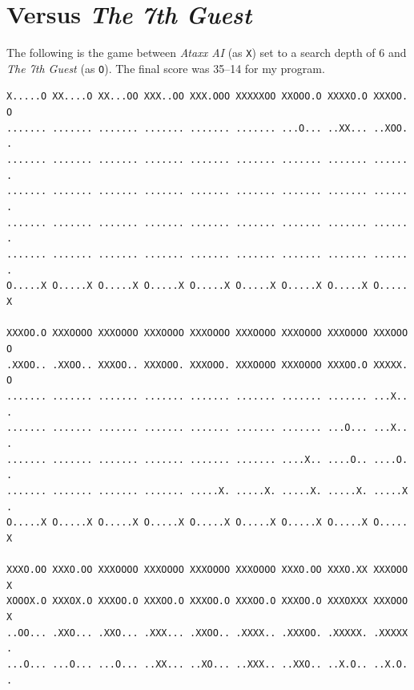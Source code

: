 \documentclass[12pt]{article}
\newcommand{\X}{\texttt{X}}
\renewcommand{\O}{\texttt{O}}
\begin{document}
\pagebreak
\appendix\section{Versus \textsl{The 7th Guest}}
The following is the game between \textsl{Ataxx AI} (as \X) set to a search depth of 6 and \textsl{The 7th Guest} (as \O).  The final score was 35--14 for my program.
\begin{center}\texttt{X.....O~XX....O~XX...OO~XXX..OO~XXX.OOO~XXXXXOO~XXOOO.O~XXXXO.O~XXXOO.O~\\
.......~.......~.......~.......~.......~.......~...O...~..XX...~..XOO..~\\
.......~.......~.......~.......~.......~.......~.......~.......~.......~\\
.......~.......~.......~.......~.......~.......~.......~.......~.......~\\
.......~.......~.......~.......~.......~.......~.......~.......~.......~\\
.......~.......~.......~.......~.......~.......~.......~.......~.......~\\
O.....X~O.....X~O.....X~O.....X~O.....X~O.....X~O.....X~O.....X~O.....X~\\
~\\
XXXOO.O~XXXOOOO~XXXOOOO~XXXOOOO~XXXOOOO~XXXOOOO~XXXOOOO~XXXOOOO~XXXOOOO~\\
.XXOO..~.XXOO..~XXXOO..~XXXOOO.~XXXOOO.~XXXOOOO~XXXOOOO~XXXOO.O~XXXXX.O~\\
.......~.......~.......~.......~.......~.......~.......~.......~...X...~\\
.......~.......~.......~.......~.......~.......~.......~...O...~...X...~\\
.......~.......~.......~.......~.......~.......~....X..~....O..~....O..~\\
.......~.......~.......~.......~.....X.~.....X.~.....X.~.....X.~.....X.~\\
O.....X~O.....X~O.....X~O.....X~O.....X~O.....X~O.....X~O.....X~O.....X~\\
~\\
XXXO.OO~XXXO.OO~XXXOOOO~XXXOOOO~XXXOOOO~XXXOOOO~XXXO.OO~XXXO.XX~XXXOOOX~\\
XOOOX.O~XXXOX.O~XXXOO.O~XXXOO.O~XXXOO.O~XXXOO.O~XXXOO.O~XXXOXXX~XXXOOOX~\\
..OO...~.XXO...~.XXO...~.XXX...~.XXOO..~.XXXX..~.XXXOO.~.XXXXX.~.XXXXX.~\\
...O...~...O...~...O...~..XX...~..XO...~..XXX..~..XXO..~..X.O..~..X.O..~\\
}
\end{center}
\end{document}
